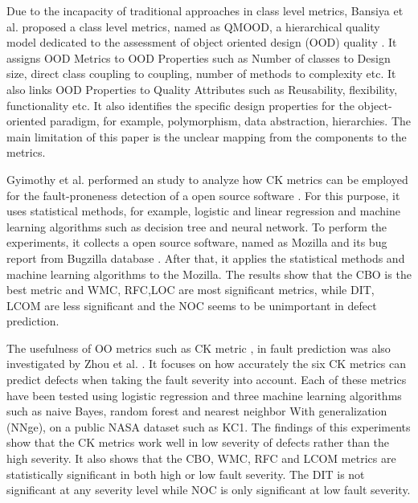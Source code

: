 \documentclass[12pt]{report}
\begin{document}
Due to the incapacity of traditional approaches in class level metrics, Bansiya et al. proposed a class level metrics, named as QMOOD, a hierarchical quality model dedicated to the assessment of object oriented design (OOD) quality \cite{bansiya2002hierarchical}. It assigns OOD Metrics to OOD Properties such as Number of classes to Design size, direct class coupling to coupling, number of methods to complexity etc. It also links OOD Properties to Quality Attributes such as Reusability, flexibility, functionality etc. It also identifies the specific design properties for the object-oriented paradigm, for example, polymorphism, data abstraction, hierarchies. The main limitation of this paper is the unclear mapping from the components to the metrics. 


Gyimothy et al. performed an study to analyze how CK metrics can be employed for the fault-proneness detection of a open source software \cite{gyimothy2005empirical}. For this purpose, it uses statistical methods, for example, logistic and linear regression and machine learning algorithms such as decision tree and neural network. To perform the experiments, it collects a open source software, named as Mozilla and its bug report from Bugzilla database \cite{BugzillaforMozilla}. After that, it applies the statistical methods and machine learning algorithms to the Mozilla. The results show that the CBO is the best metric and WMC, RFC,LOC are most significant metrics, while DIT, LCOM are less significant and the NOC seems to be unimportant in defect prediction.

The usefulness of OO metrics such as CK metric \cite{chidamber1994metrics}, in fault prediction was also investigated by Zhou et al. \cite{zhou2006empirical}. It focuses on how accurately the six CK metrics can predict defects when taking the fault severity into account. Each of these metrics have been tested using logistic regression and three machine learning algorithms such as naive Bayes, random forest and nearest neighbor With generalization (NNge), on a public NASA dataset such as KC1. The findings of this experiments show that the CK metrics work well in low severity of defects rather than the high severity. It also shows that the CBO, WMC, RFC and LCOM metrics are statistically significant in both high or low fault severity. The DIT is not significant at any severity level while NOC is only significant at low fault severity. 
\end{document}
